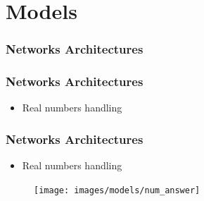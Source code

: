 \documentclass[18pt, xcolor=table]{beamer}
\begin{document}
\section{Models}

\begin{frame}[t]
  \frametitle{Networks Architectures}
\end{frame}

\begin{frame}[t]
  \frametitle{Networks Architectures}
  \begin{itemize}
  \item Real numbers handling
  \end{itemize}
\end{frame}

\begin{frame}[t]
  \frametitle{Networks Architectures}
  \begin{itemize}
  \item Real numbers handling
  \end{itemize}
  \begin{center}
    \begin{figure}[htb]
      \texttt{[image: images/models/num\_answer]}
    \end{figure}
  \end{center}
\end{frame}
\end{document}
